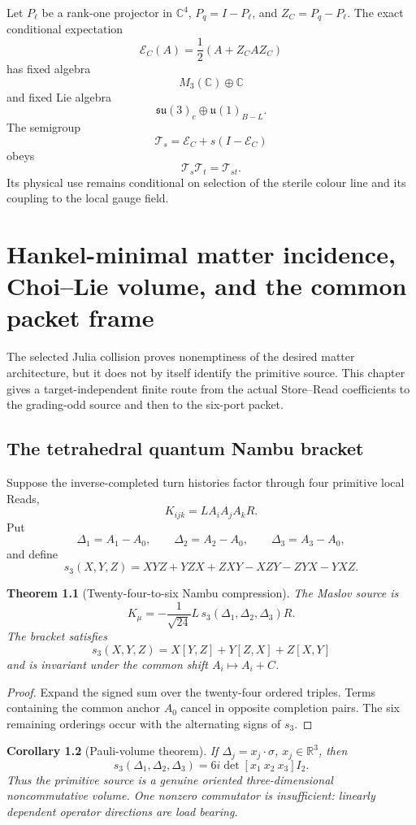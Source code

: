 \documentclass[11pt,oneside,openany]{book}
\numberwithin{equation}{chapter}
\newtheorem{theorem}{Theorem}[chapter]
\newtheorem{corollary}[theorem]{Corollary}
\theoremstyle{definition}
\theoremstyle{remark}
\newcommand{\C}{\mathbb C}
\newcommand{\R}{\mathbb R}
\begin{document}
Let \(P_\ell\) be a rank-one projector in \(\C^4\), \(P_q=I-P_\ell\), and
\(Z_C=P_q-P_\ell\).  The exact conditional expectation
\[
 \mathcal E_C(A)=\frac12(A+Z_CAZ_C)
\]
has fixed algebra
\[
 \boxed{M_3(\C)\oplus\C}
\]
and fixed Lie algebra
\[
 \boxed{\mathfrak{su}(3)_c\oplus\mathfrak u(1)_{B-L}.}
\]
The semigroup
\[
 \mathcal T_s=\mathcal E_C+s(I-\mathcal E_C)
\]
obeys
\[
 \mathcal T_s\mathcal T_t=\mathcal T_{st}.
\]
Its physical use remains conditional on selection of the sterile colour
line and its coupling to the local gauge field.

\chapter{Hankel-minimal matter incidence, Choi--Lie volume, and the common packet frame}
\label{ch:hankel-matter}

The selected Julia collision proves nonemptiness of the desired matter
architecture, but it does not by itself identify the primitive source.  This
chapter gives a target-independent finite route from the actual Store--Read
coefficients to the grading-odd source and then to the six-port packet.

\section{The tetrahedral quantum Nambu bracket}
Suppose the inverse-completed turn histories factor through four primitive
local Reads,
\[
 K_{ijk}=LA_iA_jA_kR.
\]
Put
\[
 \Delta_1=A_1-A_0,
 \qquad
 \Delta_2=A_2-A_0,
 \qquad
 \Delta_3=A_3-A_0,
\]
and define
\[
 s_3(X,Y,Z)=XYZ+YZX+ZXY-XZY-ZYX-YXZ.
\]

\begin{theorem}[Twenty-four-to-six Nambu compression]
\label{thm:v5-nambu-compression}
The Maslov source is
\[
 \boxed{
 K_\mu=-\frac1{\sqrt{24}}L\,
 s_3(\Delta_1,\Delta_2,\Delta_3)R.}
\]
The bracket satisfies
\[
 s_3(X,Y,Z)=X[Y,Z]+Y[Z,X]+Z[X,Y]
\]
and is invariant under the common shift \(A_i\mapsto A_i+C\).
\end{theorem}

\begin{proof}
Expand the signed sum over the twenty-four ordered triples.  Terms containing
the common anchor \(A_0\) cancel in opposite completion pairs.  The six
remaining orderings occur with the alternating signs of \(s_3\).
\end{proof}

\begin{corollary}[Pauli-volume theorem]
\label{cor:v5-pauli-volume}
If \(\Delta_j=x_j\cdot\sigma\), \(x_j\in\R^3\), then
\[
 \boxed{
 s_3(\Delta_1,\Delta_2,\Delta_3)
 =6i\det[x_1\ x_2\ x_3]I_2.}
\]
Thus the primitive source is a genuine oriented three-dimensional
noncommutative volume.  One nonzero commutator is insufficient: linearly
dependent operator directions are load bearing.
\end{corollary}
\end{document}
